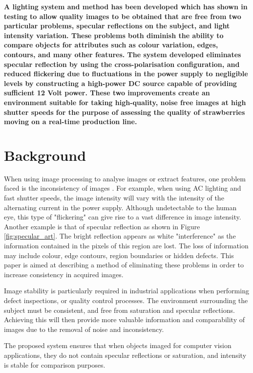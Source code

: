 \documentclass[fleqn,twoside,12pt]{report}
\begin{document}
\textbf{A lighting system and method has been developed which has shown in testing to allow quality images to be obtained that are free from two particular problems, specular reflections on the subject, and light intensity variation. These problems both diminish the ability to compare objects for attributes such as colour variation, edges, contours, and many other features. The system developed eliminates specular reflection by using the cross-polarisation configuration, and reduced flickering due to fluctuations in the power supply to negligible levels by constructing a high-power DC source capable of providing sufficient 12 Volt power. These two improvements create an environment suitable for taking high-quality, noise free images at high shutter speeds for the purpose of assessing the quality of strawberries moving on a real-time production line.}


\section{Background}


When using image processing to analyse images or extract features, one problem faced is the inconsistency of images \cite{atkinson}.  For example, when using AC lighting and fast shutter speeds, the image intensity will vary with the intensity of the alternating current in the power supply. Although undetectable to the human eye, this type of "flickering" can give rise to a vast difference in image intensity. Another example is that of specular reflection as shown in Figure \ref{fig:specular_art}. The bright reflection appears as white "interference" as the information contained in the pixels of this region are lost. The loss of information may include colour, edge contours, region boundaries or hidden defects. This paper is aimed at describing a method of eliminating these problems in order to increase consistency in acquired images.

Image stability is particularly required in industrial applications when performing defect inspections, or quality control processes. The environment surrounding the subject must be consistent, and free from saturation and specular reflections. Achieving this will then provide more valuable information and comparability of images due to the removal of noise and inconsistency.

The proposed system ensures that when objects imaged for computer vision applications, they do not contain specular reflections or saturation, and intensity is stable for comparison purposes. 
\end{document}
